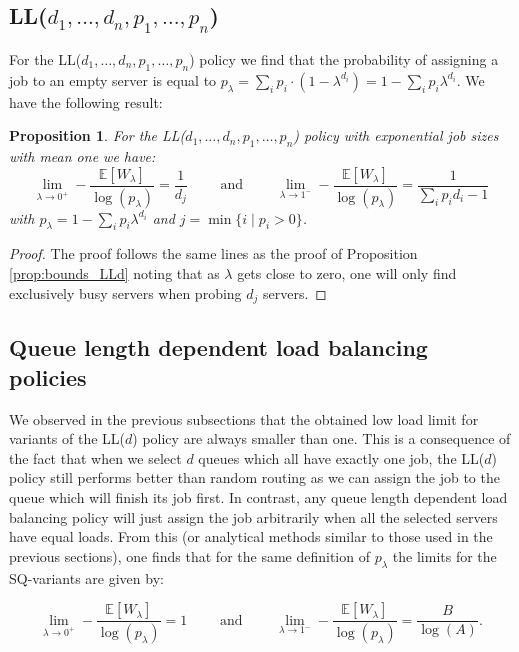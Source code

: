\documentclass[12pt]{report}
\newcommand{\E}{\mathbb{E}}
\newtheorem{proposition}[theorem]{Proposition}
\begin{document}
\subsection{LL($d_1,\dots,d_n,p_1,\dots,p_n$)}
For the LL($d_1,\dots,d_n,p_1,\dots,p_n$) policy we find that the probability of assigning a job to an empty server is equal to $p_\lambda = \sum_i p_i \cdot (1 - \lambda^{d_i}) = 1-\sum_i p_i \lambda^{d_i}$. We have the following result:
\begin{proposition} \label{prop:low_traffic_LLdK}
For the LL($d_1,\dots,d_n,p_1,\dots,p_n$) policy with exponential job sizes with mean one we have:
\begin{equation} \label{eq:low_traffic_LLd1dn}
\lim_{\lambda \rightarrow 0^+} - \frac{\E[W_\lambda]}{\log(p_\lambda)} = \frac{1}{d_j} \qquad \mbox{ and } \qquad \lim_{\lambda \rightarrow 1^-} - \frac{\E[W_\lambda]}{\log(p_\lambda)} = \frac{1}{\sum_i p_i d_i - 1}
\end{equation}
with $p_\lambda = 1 - \sum_i p_i \lambda ^{d_i}$ and $j = \min\{ i \mid p_i > 0 \}$.
\end{proposition}
\begin{proof}
The proof follows the same lines as the proof of Proposition \ref{prop:bounds_LLd} noting that as $\lambda$ gets close to zero, one will only find exclusively busy servers when probing $d_j$ servers.
\end{proof}

\subsection{Queue length dependent load balancing policies}
We observed in the previous subsections that the obtained low load limit for variants of the LL($d$) policy are always smaller than one. This is a consequence of the fact that when we select $d$ queues which all have exactly one job, the LL($d$) policy still performs better than random routing as we can assign the job to the queue which will finish its job first. In contrast, any queue length dependent load balancing policy will just assign the job arbitrarily when all the selected servers have equal loads. From this (or analytical methods similar to those used in the previous sections), one finds that for the same definition of $p_\lambda$ the limits for the SQ-variants are given by:

\begin{equation} \label{eq:low_traffic_SQ}
	\lim_{\lambda \rightarrow 0^+} - \frac{\E[W_\lambda]}{\log(p_\lambda)} = 1 \qquad \mbox{ and } \qquad \lim_{\lambda \rightarrow 1^-} - \frac{\E[W_\lambda]}{\log(p_\lambda)} = \frac{B}{\log(A)}.
\end{equation}
\end{document}
